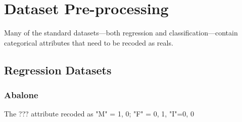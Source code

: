 \documentclass[11pt,a4paper]{article}
\begin{document}
\section*{Dataset Pre-processing}

Many of the standard datasets---both regression and classification---contain categorical attributes that need to be recoded as reals.

\subsection{Regression Datasets}

\subsubsection{Abalone}

The ??? attribute recoded as "M" = 1, 0; "F" = 0, 1, "I"=0, 0
	
\end{document}
